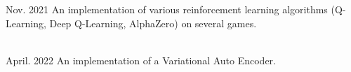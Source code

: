 \documentclass[10pt,a4paper,ragged2e,withhyper]{altacv}
\begin{document}
\begin{paracol}{2}
            {Nov. 2021}{}
            An implementation of various reinforcement learning algorithms
            (Q-Learning, Deep Q-Learning, AlphaZero)
            on several games.\\
            \vspace{4pt}
            \\
            \vspace{4pt}
            \divider
            
            {April. 2022}{}
            An implementation of a Variational Auto Encoder.\\
            \vspace{4pt}
            \\
            \vspace{4pt}
        
    \end{paracol}
\end{document}
